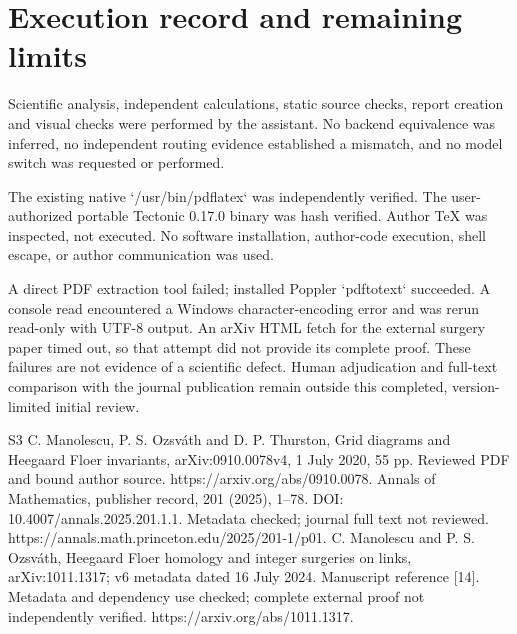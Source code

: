 \documentclass[10pt]{article}
\begin{document}
\section*{Execution record and remaining limits}
Scientific analysis, independent calculations, static source checks, report creation and visual checks were performed by the assistant. No backend equivalence was inferred, no independent routing evidence established a mismatch, and no model switch was requested or performed.\par
The existing native `/usr/bin/pdflatex` was independently verified. The user-authorized portable Tectonic 0.17.0 binary was hash verified. Author TeX was inspected, not executed. No software installation, author-code execution, shell escape, or author communication was used.\par
A direct PDF extraction tool failed; installed Poppler `pdftotext` succeeded. A console read encountered a Windows character-encoding error and was rerun read-only with UTF-8 output. An arXiv HTML fetch for the external surgery paper timed out, so that attempt did not provide its complete proof. These failures are not evidence of a scientific defect. Human adjudication and full-text comparison with the journal publication remain outside this completed, version-limited initial review.\par
S3 C. Manolescu, P. S. Ozsváth and D. P. Thurston, Grid diagrams and Heegaard Floer invariants, arXiv:0910.0078v4, 1 July 2020, 55 pp. Reviewed PDF and bound author source. https://arxiv.org/abs/0910.0078. Annals of Mathematics, publisher record, 201 (2025), 1–78. DOI: 10.4007/annals.2025.201.1.1. Metadata checked; journal full text not reviewed. https://annals.math.princeton.edu/2025/201-1/p01. C. Manolescu and P. S. Ozsváth, Heegaard Floer homology and integer surgeries on links, arXiv:1011.1317; v6 metadata dated 16 July 2024. Manuscript reference [14]. Metadata and dependency use checked; complete external proof not independently verified. https://arxiv.org/abs/1011.1317.\par
\end{document}
